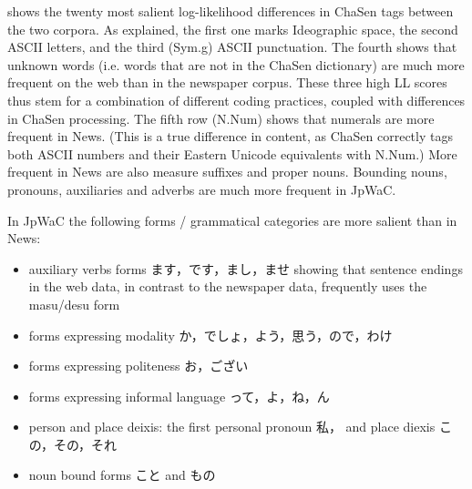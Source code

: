 \documentclass[english]{jnlp_1.4}
\newcommand{\reftab}[1]{}
\begin{document}
\begin{table}[b]
\begin{center}

\label{tab2}
\end{center}
\end{table}

\reftab{tab2} shows the twenty most salient log-likelihood differences
in ChaSen tags between the two corpora. As explained, the first one
marks Ideographic space, the second ASCII letters, and the third
(Sym.g) ASCII punctuation. The fourth shows that unknown words
(i.e. words that are not in the ChaSen dictionary) are much more
frequent on the web than in the newspaper corpus. These three high LL
scores thus stem for a combination of different coding practices,
coupled with differences in ChaSen processing. The fifth row (N.Num)
shows that numerals are more frequent in News. (This is a true
difference in content, as ChaSen correctly tags both ASCII numbers and
their Eastern Unicode equivalents with N.Num.) More frequent in News
are also measure suffixes and proper nouns. Bounding nouns, pronouns,
auxiliaries and adverbs are much more frequent in JpWaC.

In JpWaC the following forms / grammatical categories are more salient than in News:
\begin{itemize}
\item auxiliary verbs forms ます，です，まし，ませ showing that sentence endings in the web data, in contrast to the newspaper data, frequently uses the masu/desu form
\item forms expressing modality か，でしょ，よう，思う，ので，わけ
\item forms expressing politeness お，ござい
\item forms expressing informal language って，よ，ね，ん
\item person and place deixis: the first personal pronoun 私， and place diexis この，その，それ
\item noun bound forms こと and もの
\end{itemize}
\end{document}
